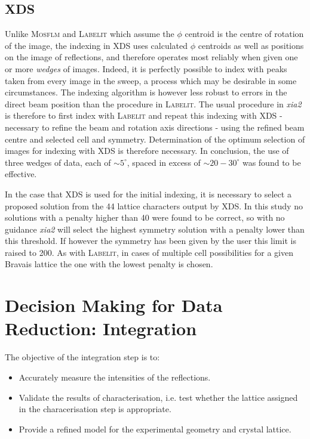 \documentclass[a4paper, 11pt]{article}
\begin{document}
\subsection{XDS}

Unlike \textsc{Mosflm} and \textsc{Labelit} which assume the $\phi$
centroid is the centre of rotation of the image, 
the indexing in XDS uses calculated $\phi$
centroids as well as positions on the image of reflections, and
therefore operates most reliably when given one or more \emph{wedges} of
images. Indeed, it is perfectly possible to index with peaks taken
from every image in the sweep, a process which may be desirable in some
circumstances. The indexing algorithm is however less robust to
errors in the direct beam position than the procedure in
\textsc{Labelit}. The usual procedure in \emph{xia2} is therefore to first
index with \textsc{Labelit} and repeat this indexing with XDS
 - necessary to refine the beam and rotation axis directions - 
using the refined beam centre and selected cell and symmetry. 
Determination of the optimum selection of images for indexing with XDS
is therefore necessary. In conclusion, the use of three wedges of
data, each of $\sim 5^{\circ}$, spaced in excess of $\sim 20 -
30^{\circ}$ was found to be effective.

In the case that XDS is used for the initial indexing, it is necessary
to select a proposed solution from the 44 lattice characters output by
XDS. In this study no solutions with a penalty higher than 40 were
found to be correct, so with no guidance \emph{xia2} will select the
highest symmetry solution with a penalty lower than this threshold. If
however the symmetry has been given by the user this limit is raised
to 200. As with \textsc{Labelit}, in cases of multiple cell possibilities for a
given Bravais lattice the one with the lowest penalty is chosen.

\section{Decision Making for Data Reduction: Integration}

The objective of the integration step is to:

\begin{itemize}
\item{Accurately measure the intensities of the reflections.}
\item{Validate the results of characterisation, i.e. test whether the
    lattice assigned in the characerisation step is appropriate.}
\item{Provide a refined model for the experimental geometry and
    crystal lattice.}
\end{itemize}
\end{document}
